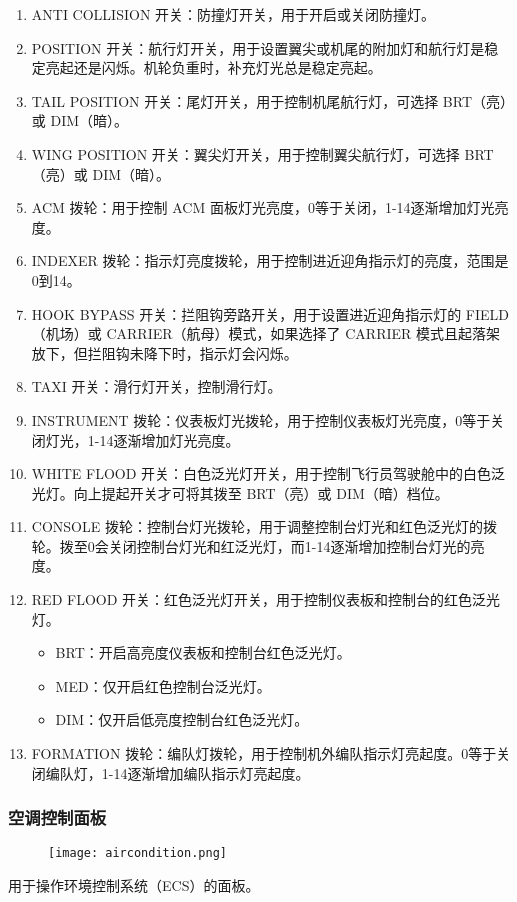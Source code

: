 \begin{enumerate}
  \item ANTI COLLISION 开关：防撞灯开关，用于开启或关闭防撞灯。
  \item POSITION 开关：航行灯开关，用于设置翼尖或机尾的附加灯和航行灯是稳定亮起还是闪烁。机轮负重时，补充灯光总是稳定亮起。
  \item TAIL POSITION 开关：尾灯开关，用于控制机尾航行灯，可选择 BRT（亮）或 DIM（暗）。
  \item WING POSITION 开关：翼尖灯开关，用于控制翼尖航行灯，可选择 BRT（亮）或 DIM（暗）。
  \item ACM 拨轮：用于控制 ACM 面板灯光亮度，0等于关闭，1-14逐渐增加灯光亮度。
  \item INDEXER 拨轮：指示灯亮度拨轮，用于控制进近迎角指示灯的亮度，范围是0到14。
  \item HOOK BYPASS 开关：拦阻钩旁路开关，用于设置进近迎角指示灯的 FIELD（机场）或 CARRIER（航母）模式，如果选择了 CARRIER 模式且起落架放下，但拦阻钩未降下时，指示灯会闪烁。
  \item TAXI 开关：滑行灯开关，控制滑行灯。
  \item INSTRUMENT 拨轮：仪表板灯光拨轮，用于控制仪表板灯光亮度，0等于关闭灯光，1-14逐渐增加灯光亮度。
  \item WHITE FLOOD 开关：白色泛光灯开关，用于控制飞行员驾驶舱中的白色泛光灯。向上提起开关才可将其拨至 BRT（亮）或 DIM（暗）档位。
  \item CONSOLE 拨轮：控制台灯光拨轮，用于调整控制台灯光和红色泛光灯的拨轮。拨至0会关闭控制台灯光和红泛光灯，而1-14逐渐增加控制台灯光的亮度。
  \item RED FLOOD 开关：红色泛光灯开关，用于控制仪表板和控制台的红色泛光灯。
  \begin{itemize}
    \item BRT：开启高亮度仪表板和控制台红色泛光灯。
    \item MED：仅开启红色控制台泛光灯。
    \item DIM：仅开启低亮度控制台红色泛光灯。
  \end{itemize}
  \item FORMATION 拨轮：编队灯拨轮，用于控制机外编队指示灯亮起度。0等于关闭编队灯，1-14逐渐增加编队指示灯亮起度。
\end{enumerate}

\subsubsection{空调控制面板}

\begin{figure}[htb]
  \center
  \texttt{[image: aircondition.png]}
\end{figure}
用于操作环境控制系统（ECS）的面板。

